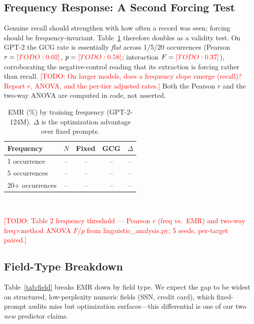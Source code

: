 \documentclass[letterpaper,twocolumn,10pt]{article}
\newcommand{\todo}[1]{\textcolor{red}{[TODO: #1]}}
\begin{document}
\subsection{Frequency Response: A Second Forcing Test}
Genuine recall should strengthen with how often a record was seen; forcing
should be frequency-invariant. Table~\ref{tab:freq} therefore doubles as a
validity test. On GPT-2 the GCG rate is essentially \emph{flat} across 1/5/20
occurrences (Pearson $r=\todo{0.02}$, $p=\todo{0.58}$; interaction
$F=\todo{0.37}$), corroborating the negative-control reading that its extraction
is forcing rather than recall. \todo{On larger models, does a frequency slope
emerge (recall)? Report $r$, ANOVA, and the per-tier adjusted rates.} Both the
Pearson $r$ and the two-way ANOVA are computed in code, not asserted.

\begin{table}[t]
\centering
\caption{EMR (\%) by training frequency (GPT-2-124M). $\Delta$ is the
optimization advantage over fixed prompts.}
\label{tab:freq}
\small
\begin{tabular}{@{}lcccc@{}}
\toprule
\textbf{Frequency} & $N$ & \textbf{Fixed} & \textbf{GCG} & $\Delta$ \\
\midrule
1 occurrence   & -- & -- & -- & -- \\
5 occurrences  & -- & -- & -- & -- \\
20+ occurrences & -- & -- & -- & -- \\
\bottomrule
\end{tabular}
\\[2pt]
\raggedright\footnotesize
\todo{Table 2 frequency threshold --- Pearson $r$ (freq vs.\ EMR) and two-way
freq$\times$method ANOVA $F$/$p$ from linguistic\_analysis.py; 5 seeds,
per-target paired.}
\end{table}

\subsection{Field-Type Breakdown}
Table~\ref{tab:field} breaks EMR down by field type. We expect the gap to be
widest on structured, low-perplexity numeric fields (SSN, credit card), which
fixed-prompt audits miss but optimization surfaces---this differential is one
of our two \emph{new} predictor claims.
\end{document}
